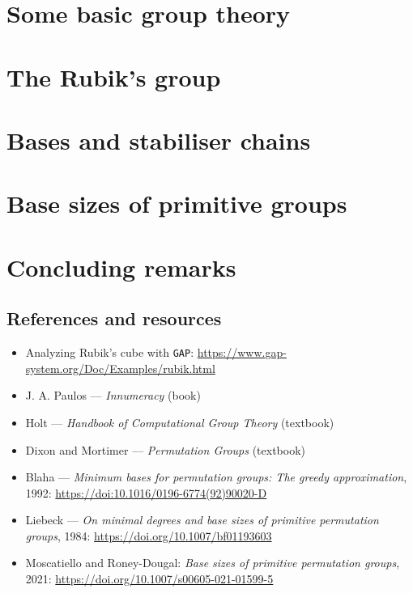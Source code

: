 \documentclass{beamer}
\begin{document}
\section{Some basic group theory}



\section{The Rubik's group}



\section{Bases and stabiliser chains}



\section{Base sizes of primitive groups}



\section{Concluding remarks}

\subsection{References and resources}

\begin{slide}
    \small
    \begin{itemize}
        \item Analyzing Rubik's cube with \texttt{GAP}: \url{https://www.gap-system.org/Doc/Examples/rubik.html}
        \item J. A. Paulos --- \textit{Innumeracy} (book)
        \item Holt --- \textit{Handbook of Computational Group Theory} (textbook)
        \item Dixon and Mortimer --- \textit{Permutation Groups} (textbook)
        \item Blaha --- \textit{Minimum bases for permutation groups: The greedy approximation}, 1992: \url{https://doi:10.1016/0196-6774(92)90020-D}
        \item Liebeck --- \textit{On minimal degrees and base sizes of primitive permutation groups}, 1984: \url{https://doi.org/10.1007/bf01193603}
        \item Moscatiello and Roney-Dougal: \textit{Base sizes of primitive permutation groups}, 2021: \url{https://doi.org/10.1007/s00605-021-01599-5}
    \end{itemize}
\end{slide}
\end{document}
